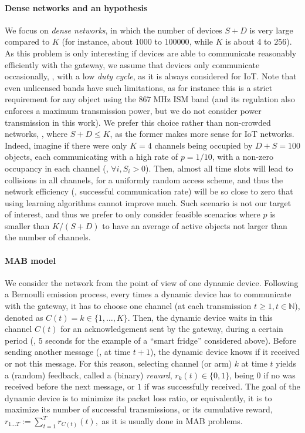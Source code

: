 \paragraph{Dense networks and an hypothesis}
%
We focus on \emph{dense networks}, in which the number of devices $S + D$ is very large compared to $K$ (for instance, about $1000$ to $100000$, while $K$ is about $4$ to $256$).
As this problem is only interesting if devices are able to communicate reasonably efficiently with the gateway, we assume that devices only communicate occasionally, \ie, with a low \emph{duty cycle}, as it is always considered for IoT.
Note that even unlicensed bands have such limitations, as for instance this is a strict requirement for any object using the $867\;\mathrm{MHz}$ ISM band (and its regulation also enforces a maximum transmission power, but we do not consider power transmission in this work).
%
We prefer this choice rather than non-crowded networks, \ie, where $S + D \leq K$, as the former makes more sense for IoT networks.
Indeed, imagine if there were only $K=4$ channels being occupied by $D+S = 100$ objects, each communicating with a high rate of $p=1/10$, with a non-zero occupancy in each channel (\ie, $\forall i, S_i > 0$). Then, almost all time slots will lead to collisions in all channels, for a uniformly random access scheme, and thus the network efficiency (\ie, successful communication rate) will be so close to zero that using learning algorithms cannot improve much.
Such scenario is not our target of interest, and thus we prefer to only consider feasible scenarios where $p$ is smaller than $K/(S+D)$ to have an average of active objects not larger than the number of channels.


\paragraph{MAB model}
%
We consider the network from the point of view of one dynamic device.
Following a Bernoulli emission process, every times a dynamic device has to communicate with the gateway,
it has to choose one channel (at each transmission $t \geq 1, t \in \mathbb{N}$), denoted as $C(t) = k \in\{1,\dots,K\}$.
Then, the dynamic device waits in this channel $C(t)$ for an acknowledgement sent by the gateway, during a certain period (\eg, $5$ seconds for the example of a ``smart fridge'' considered above).
Before sending another message (\ie, at time $t+1$), the dynamic device knows if it received or not this \Ack{} message.
%
For this reason, selecting channel (or arm) $k$ at time $t$ yields a (random) feedback, called a (binary) \emph{reward}, $r_k(t) \in \{0,1\}$, being $0$ if no \Ack{} was received before the next message, or $1$ if \Ack{} was successfully received.
The goal of the dynamic device is to minimize its packet loss ratio, or equivalently, it is to maximize its number of successful transmissions, or its cumulative reward,
$r_{1 \dots T} := \sum_{t = 1}^T r_{C(t)}(t),$
as it is usually done in MAB problems.


